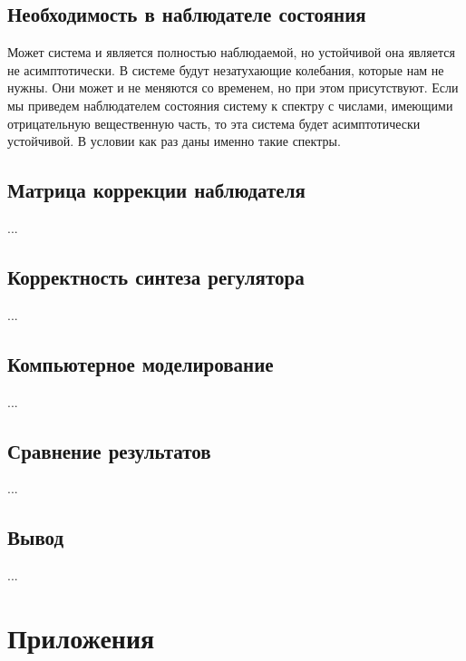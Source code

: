 \documentclass[a4paper, 12pt]{article}
\begin{document}
    \subsection{Необходимость в наблюдателе состояния}
    Может система и является полностью наблюдаемой, но устойчивой она является не асимптотически.
    В системе будут незатухающие колебания, которые нам не нужны. Они может и не меняются со временем,
    но при этом присутствуют. Если мы приведем наблюдателем состояния систему к спектру с числами,
    имеющими отрицательную вещественную часть, то эта система будет асимптотически устойчивой.
    В условии как раз даны именно такие спектры.


    \subsection{Матрица коррекции наблюдателя}
    ...


    \subsection{Корректность синтеза регулятора}
    ...


    \subsection{Компьютерное моделирование}
    ...


    \subsection{Сравнение результатов}
    ...

    
    \subsection{Вывод}
    ...


    \section{Приложения}
\end{document}
